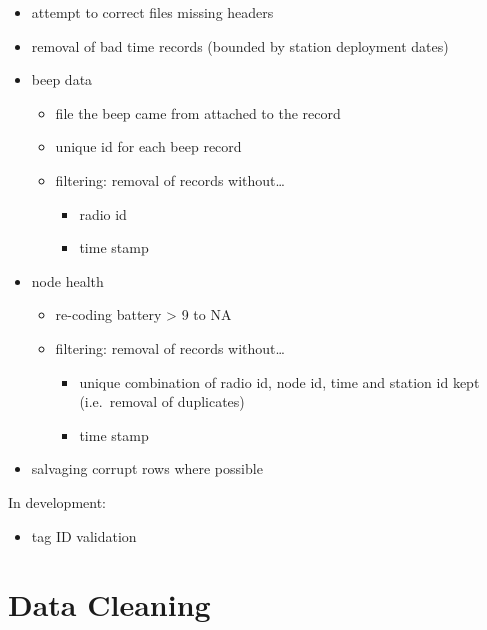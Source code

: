 \documentclass[
]{book}
\providecommand{\tightlist}{%
  \setlength{\itemsep}{0pt}\setlength{\parskip}{0pt}}
\begin{document}
\begin{itemize}
\tightlist
\item
  attempt to correct files missing headers
\item
  removal of bad time records (bounded by station deployment dates)
\item
  beep data

  \begin{itemize}
  \tightlist
  \item
    file the beep came from attached to the record
  \item
    unique id for each beep record
  \item
    filtering: removal of records without\ldots{}

    \begin{itemize}
    \tightlist
    \item
      radio id
    \item
      time stamp
    \end{itemize}
  \end{itemize}
\item
  node health

  \begin{itemize}
  \tightlist
  \item
    re-coding battery \textgreater{} 9 to NA
  \item
    filtering: removal of records without\ldots{}

    \begin{itemize}
    \tightlist
    \item
      unique combination of radio id, node id, time and station id kept (i.e.~removal of duplicates)
    \item
      time stamp\\
    \end{itemize}
  \end{itemize}
\item
  salvaging corrupt rows where possible
\end{itemize}

In development:

\begin{itemize}
\tightlist
\item
  tag ID validation
\end{itemize}

\section{Data Cleaning}\label{data-cleaning}
\end{document}
